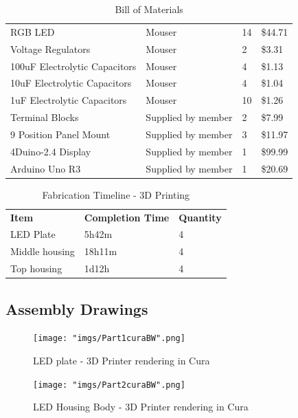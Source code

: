 \documentclass[12pt,a4paper]{report}
\begin{document}
\begin{table}[H]
\begin{center}
\begin{tabular}{llll}
RGB LED                       & Mouser          & 14       & \$44.71  \\
Voltage Regulators            & Mouser          & 2        & \$3.31   \\
100uF Electrolytic Capacitors & Mouser          & 4        & \$1.13   \\
10uF Electrolytic Capacitors  & Mouser          & 4        & \$1.04   \\
1uF Electrolytic Capacitors   & Mouser          & 10       & \$1.26   \\
Terminal Blocks               & Supplied by member        & 2        & \$7.99   \\
9 Position Panel Mount        & Supplied by member        & 3        & \$11.97  \\
4Duino-2.4 Display            & Supplied by member        & 1        & \$99.99  \\
Arduino Uno R3                & Supplied by member        & 1        & \$20.69 
\end{tabular}
\end{center}
\caption {Bill of Materials}
\label{tab:title}
\end{table}
\thispagestyle{empty}
\newpage
\begin{table}[H]
\begin{center}
\begin{tabular}{lll}
\textbf{Item}          & \textbf{Completion Time} & \textbf{Quantity} \\
LED Plate     & 5h42m           & 4        \\
Middle housing & 18h11m          & 4        \\
Top housing   & 1d12h           & 4       
\end{tabular}
\end{center}
\caption {Fabrication Timeline - 3D Printing}
\label{tab:title}
\end{table}

\subsection{Assembly Drawings}
\begin{figure}[H]
	\centering
	\texttt{[image: "imgs/Part1curaBW".png]}\par			\vspace{0.1cm}
	\caption{LED plate - 3D Printer rendering in Cura}
\end{figure}

\begin{figure}[H]
	\centering
	\texttt{[image: "imgs/Part2curaBW".png]}\par			\vspace{0.1cm}
	\caption{LED Housing Body - 3D Printer rendering in Cura}
\end{figure}
\end{document}
